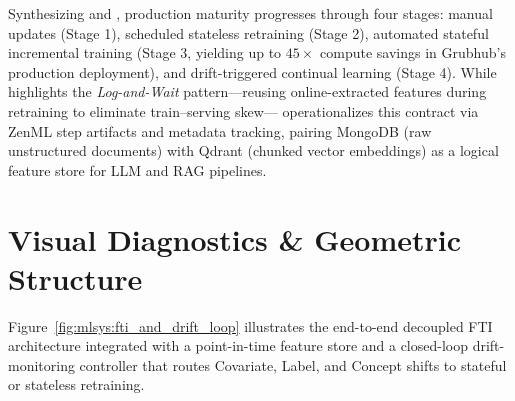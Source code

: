 \documentclass[../../../../master.tex]{subfiles}
\begin{document}
\begin{crossbook}
Synthesizing  and , production maturity progresses through four stages: manual updates (Stage 1), scheduled stateless retraining (Stage 2), automated stateful incremental training (Stage 3, yielding up to $45\times$ compute savings in Grubhub's production deployment), and drift-triggered continual learning (Stage 4). While  highlights the \emph{Log-and-Wait} pattern---reusing online-extracted features during retraining to eliminate train--serving skew--- operationalizes this contract via ZenML step artifacts and metadata tracking, pairing MongoDB (raw unstructured documents) with Qdrant (chunked vector embeddings) as a logical feature store for LLM and RAG pipelines.
\end{crossbook}

\section{Visual Diagnostics \& Geometric Structure}\label{sec:mlsys:visuals}

Figure~\ref{fig:mlsys:fti_and_drift_loop} illustrates the end-to-end decoupled FTI architecture integrated with a point-in-time feature store and a closed-loop drift-monitoring controller that routes Covariate, Label, and Concept shifts to stateful or stateless retraining.
\end{document}
